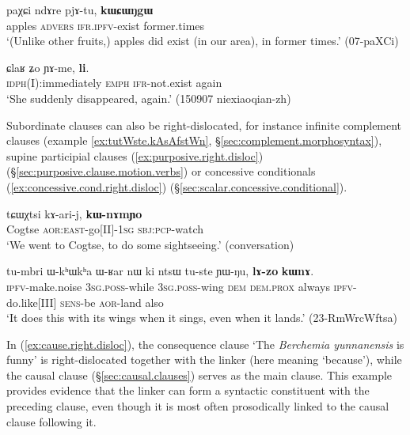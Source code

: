 \begin{exe}
\ex \label{ex:time.adj.right.disloc}
\gll paχɕi ndɤre pjɤ-tu, \textbf{kɯɕɯŋgɯ} \\
apples \textsc{advers} \textsc{ifr}.\textsc{ipfv}-exist former.times \\
\glt `(Unlike other fruits,) apples did exist (in our area), in former times.' (07-paXCi)
\end{exe}

\begin{exe}
\ex \label{ex:adv.right.disloc}
\gll ɕlaʁ ʑo ɲɤ-me, \textbf{li}. \\
\textsc{idph}(I):immediately \textsc{emph} \textsc{ifr}-not.exist again \\
\glt `She suddenly disappeared, again.' (150907 niexiaoqian-zh)
\end{exe}


Subordinate clauses can also be right-dislocated, for instance infinite complement clauses (example \ref{ex:tutWste.kAsAfstWn}, §\ref{sec:complement.morphosyntax}), supine participial clauses (\ref{ex:purposive.right.disloc}) (§\ref{sec:purposive.clause.motion.verbs}) or concessive conditionals (\ref{ex:concessive.cond.right.disloc}) (§\ref{sec:scalar.concessive.conditional}).


\begin{exe}
\ex \label{ex:purposive.right.disloc}
\gll tɕɯχtsi kɤ-ari-j, \textbf{kɯ-nɤmɲo} \\
Cogtse \textsc{aor}:\textsc{east}-go[II]-\textsc{1sg} \textsc{sbj}:\textsc{pcp}-watch \\
\glt `We went to Cogtse, to do some sightseeing.' (conversation)
\end{exe}

\begin{exe}
\ex \label{ex:concessive.cond.right.disloc}
\gll tu-mbri ɯ-kʰɯkʰa ɯ-ʁar nɯ ki ntsɯ tu-ste ɲɯ-ŋu, \textbf{lɤ-zo} \textbf{kɯnɤ}. \\
\textsc{ipfv}-make.noise \textsc{3sg}.\textsc{poss}-while \textsc{3sg}.\textsc{poss}-wing \textsc{dem} \textsc{dem}.\textsc{prox} always \textsc{ipfv}-do.like[III] \textsc{sens}-be \textsc{aor}-land also \\
\glt `It does this with its wings when it sings, even when it lands.' (23-RmWrcWftsa)
\end{exe}

In (\ref{ex:cause.right.disloc}), the consequence clause  `The \textit{Berchemia yunnanensis} is funny' is right-dislocated together with the linker  (here meaning `because'), while the causal clause (§\ref{sec:causal.clauses}) serves as the main clause. This example provides evidence that the linker  can form a syntactic constituent with the preceding clause, even though it is most often prosodically linked to the causal clause following it.

